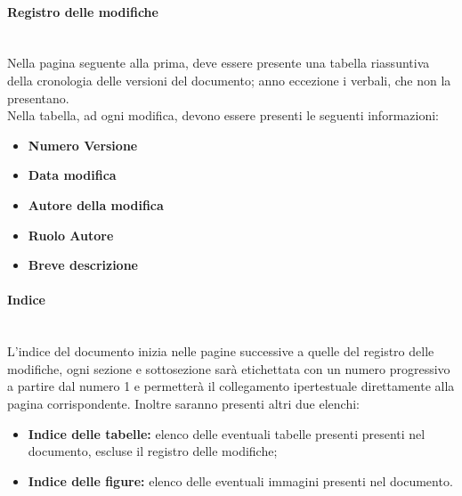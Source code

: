 \documentclass[11pt,a4paper]{article}
\begin{document}
	\paragraph{Registro delle modifiche}
	 	\noindent \\
	 	Nella pagina seguente alla prima, deve essere presente una tabella riassuntiva della cronologia delle versioni del documento; anno eccezione i verbali, che non la presentano. \\
Nella tabella, ad ogni modifica, devono essere presenti le seguenti informazioni:
	
	\begin{itemize}
	    \item \textbf{Numero Versione}
		\item \textbf{Data modifica}
		\item \textbf{Autore della modifica}
		\item \textbf{Ruolo Autore}
		\item \textbf{Breve descrizione}
	\end{itemize}
	
	\paragraph{Indice}
	\noindent \\L'indice del documento inizia nelle pagine successive a quelle del registro delle modifiche, ogni sezione e sottosezione sarà etichettata con un numero progressivo a partire dal numero 1 e permetterà il collegamento ipertestuale direttamente alla pagina corrispondente. Inoltre saranno presenti altri due elenchi:
	
	\begin{itemize}
	\item \textbf{Indice delle tabelle:} elenco delle eventuali tabelle presenti presenti nel documento, escluse il registro delle modifiche;
	\item  \textbf{Indice delle figure:} elenco delle eventuali immagini presenti nel documento. 
	\end{itemize}
	
\end{document}
